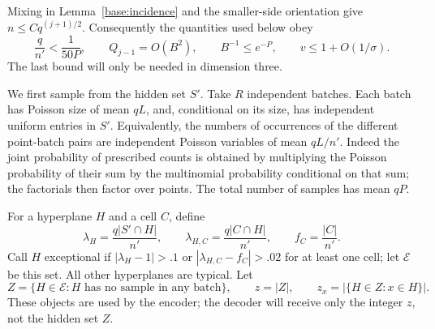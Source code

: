 Mixing in Lemma~\ref{base:incidence} and the smaller-side orientation
give $n\le Cq^{(j+1)/2}$. Consequently the quantities used below obey
\begin{equation}\label{learn:elementary-sizes}
 \frac q{n'}<\frac1{50P},\qquad
 Q_{j-1}=O(B^2),\qquad B^{-1}\le e^{-P},\qquad
 v\le1+O(1/\sigma).
\end{equation}
The last bound will only be needed in dimension three.

We first sample from the hidden set $S'$. Take $R$ independent batches.
Each batch has Poisson size of mean $qL$, and, conditional on its size,
has independent uniform entries in $S'$. Equivalently, the numbers of
occurrences of the different point-batch pairs are independent Poisson
variables of mean $qL/n'$. Indeed the joint probability of prescribed
counts is obtained by multiplying the Poisson probability of their sum
by the multinomial probability conditional on that sum; the factorials
then factor over points. The total number of samples has mean $qP$.

For a hyperplane $H$ and a cell $C$, define
\[
 \lambda_H=\frac{q|S'\cap H|}{n'},\qquad
 \lambda_{H,C}=\frac{q|C\cap H|}{n'},\qquad f_C=\frac{|C|}{n'}.
\]
Call $H$ exceptional if $|\lambda_H-1|>.1$ or
$|\lambda_{H,C}-f_C|>.02$ for at least one cell; let $\mathcal E$
be this set. All other hyperplanes are typical. Let
\begin{equation}\label{learn:empty-set}
 Z=\{H\in\mathcal E:H\text{ has no sample in any batch}\},\qquad
 z=|Z|,\qquad z_x=|\{H\in Z:x\in H\}|.
\end{equation}
These objects are used by the encoder; the decoder will receive only
the integer $z$, not the hidden set $Z$.

